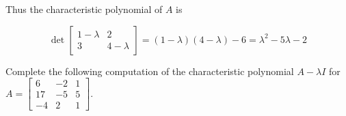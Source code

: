 \begin{applicationActivities}{3}{27}
\begin{definition}
Thus the characteristic polynomial of \(A\) is

\[
  \det\begin{bmatrix}1-\lambda & 2 \\ 3 & 4-\lambda\end{bmatrix}
=
  (1-\lambda)(4-\lambda)-6
=
  \lambda^2-5\lambda-2
\]
\end{definition}

\begin{activity}{15}
  Complete the following computation of the characteristic polynomial
  \(A-\lambda I\) for
  $A=\begin{bmatrix} 6 & -2 & 1 \\ 17 & -5 & 5 \\ -4 & 2 & 1 \end{bmatrix}$.


\end{activity}
\end{applicationActivities}

